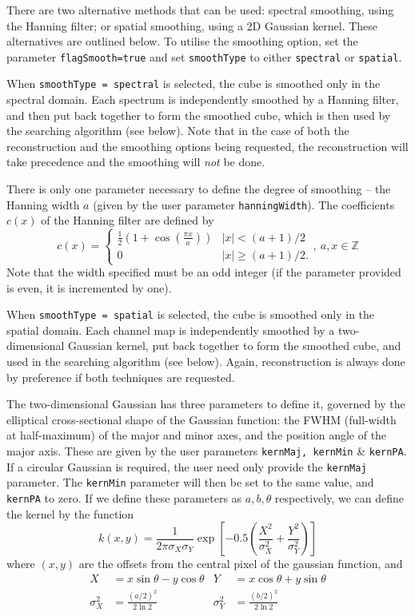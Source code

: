 There are two alternative methods that can be used: spectral
smoothing, using the Hanning filter; or spatial smoothing, using a 2D
Gaussian kernel. These alternatives are outlined below. To utilise the
smoothing option, set the parameter \texttt{flagSmooth=true} and set
\texttt{smoothType} to either \texttt{spectral} or \texttt{spatial}.


When \texttt{smoothType = spectral} is selected, the cube is smoothed
only in the spectral domain. Each spectrum is independently smoothed
by a Hanning filter, and then put back together to form the smoothed
cube, which is then used by the searching algorithm (see below). Note
that in the case of both the reconstruction and the smoothing options
being requested, the reconstruction will take precedence and the
smoothing will \emph{not} be done.

There is only one parameter necessary to define the degree of
smoothing -- the Hanning width $a$ (given by the user parameter
\texttt{hanningWidth}). The coefficients $c(x)$ of the Hanning filter
are defined by
\[
c(x) = 
  \begin{cases}
   \frac{1}{2}\left(1+\cos(\frac{\pi x}{a})\right) &|x| < (a+1)/2\\
   0                                               &|x| \geq (a+1)/2.
  \end{cases},\ a,x \in \mathbb{Z}
\]
Note that the width specified must be an
odd integer (if the parameter provided is even, it is incremented by
one).


When \texttt{smoothType = spatial} is selected, the cube is smoothed
only in the spatial domain. Each channel map is independently smoothed
by a two-dimensional Gaussian kernel, put back together to form the
smoothed cube, and used in the searching algorithm (see below). Again,
reconstruction is always done by preference if both techniques are
requested.

The two-dimensional Gaussian has three parameters to define it,
governed by the elliptical cross-sectional shape of the Gaussian
function: the FWHM (full-width at half-maximum) of the major and minor
axes, and the position angle of the major axis. These are given by the
user parameters \texttt{kernMaj, kernMin} \& \texttt{kernPA}. If a
circular Gaussian is required, the user need only provide the
\texttt{kernMaj} parameter. The \texttt{kernMin} parameter will then
be set to the same value, and \texttt{kernPA} to zero.  If we define
these parameters as $a,b,\theta$ respectively, we can define the
kernel by the function
\[ 
k(x,y) = \frac{1}{2\pi\sigma_X\sigma_Y} \exp\left[-0.5
  \left(\frac{X^2}{\sigma_X^2} + \frac{Y^2}{\sigma_Y^2} \right)
\right]
\]
where $(x,y)$ are the offsets from the central pixel of the gaussian
function, and 
\begin{align*}
X& = x\sin\theta - y\cos\theta&
  Y&= x\cos\theta + y\sin\theta\\
\sigma_X^2& = \frac{(a/2)^2}{2\ln2}&
  \sigma_Y^2& = \frac{(b/2)^2}{2\ln2}\\
\end{align*}


